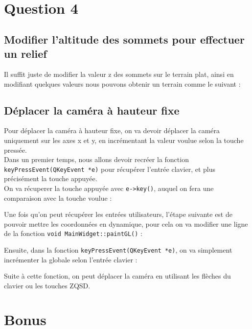 \documentclass[a4paper,11pt]{report}
\begin{document}
	\section{Question 4}
	\subsection{Modifier l'altitude des sommets pour effectuer un relief}
	Il suffit juste de modifier la valeur z des sommets sur le terrain plat, ainsi en modifiant quelques valeurs nous pouvons obtenir un terrain comme le suivant :
	
	\subsection{Déplacer la caméra à hauteur fixe}
	Pour déplacer la caméra à hauteur fixe, on va devoir déplacer la caméra uniquement sur les axes x et y, en incrémentant la valeur voulue selon la touche pressée.\\
	Dans un premier temps, nous allons devoir recréer la fonction \lstinline{keyPressEvent(QKeyEvent *e)} pour récupérer l'entrée clavier, et plus précisément la touche appuyée.\\
	On va récuperer la touche appuyée avec \lstinline{e->key()}, auquel on fera une comparaison avec la touche voulue :
	
	Une fois qu'on peut récupérer les entrées utilisateurs, l'étape suivante est de pouvoir mettre les coordonnées en dynamique, pour cela on va modifier une ligne de la fonction \lstinline{void MainWidget::paintGL()} :
	
	Ensuite, dans la fonction \lstinline{keyPressEvent(QKeyEvent *e)}, on va simplement incrémenter la globale selon l'entrée clavier :
	
	Suite à cette fonction, on peut déplacer la caméra en utilisant les flèches du clavier ou les touches ZQSD.
	
	\pagebreak
	\section{Bonus}
    	
\end{document}
